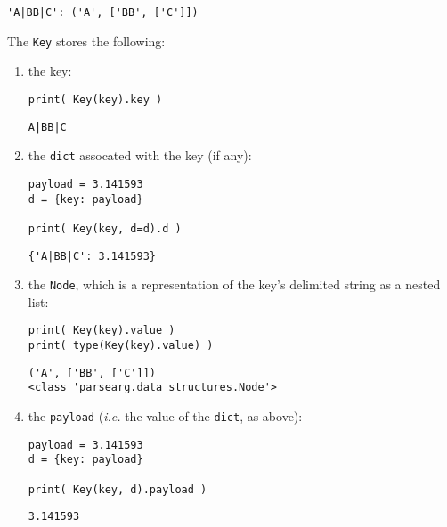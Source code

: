 \documentclass[10pt]{amsart}
\numberwithin{equation}{section}
\begin{document}
\begin{verbatim}
'A|BB|C': ('A', ['BB', ['C']])
\end{verbatim}


The \texttt{Key} stores the following: 
\begin{enumerate}
\item the key:
\begin{verbatim}
print( Key(key).key )
\end{verbatim}

\begin{verbatim}
A|BB|C
\end{verbatim}

\item the \texttt{dict} assocated with the key (if any):
\begin{verbatim}
payload = 3.141593
d = {key: payload}

print( Key(key, d=d).d )
\end{verbatim}

\begin{verbatim}
{'A|BB|C': 3.141593}
\end{verbatim}

\item the \texttt{Node}, which is a representation of the key's delimited string
as a nested list:
\begin{verbatim}
print( Key(key).value )
print( type(Key(key).value) )
\end{verbatim}

\begin{verbatim}
('A', ['BB', ['C']])
<class 'parsearg.data_structures.Node'>
\end{verbatim}

\item the \texttt{payload} (\emph{i.e.} the value of the \texttt{dict}, as above):
\begin{verbatim}
payload = 3.141593
d = {key: payload}

print( Key(key, d).payload )
\end{verbatim}

\begin{verbatim}
3.141593
\end{verbatim}
\end{enumerate}
\end{document}
